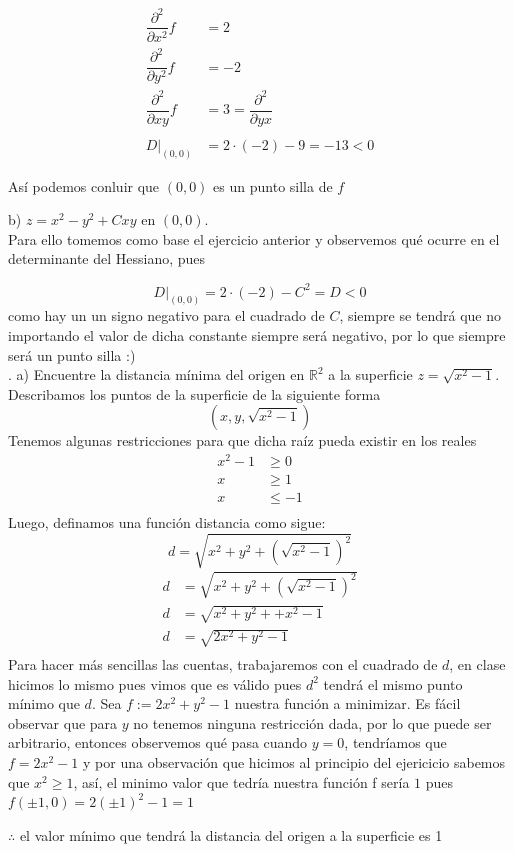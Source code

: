 \documentclass[letterpaper]{article}
\renewcommand{\d}{\partial}
\renewcommand{\*}{\cdot}
\theoremstyle{definition}
\begin{document}
\begin{align*}
	\dfrac{\d^2 }{\d x^2} f &=  2\\ 
	\dfrac{\d^2 }{\d y^2} f &=  -2\\ 
	\dfrac{\d^2 }{\d xy} f &= 3 = \dfrac{\d^2 }{\d yx} \\
	\\
	D\Bigr|_{(0,0)} &= 2 \* (-2) - 9 = -13 < 0
\end{align*}
\begin{center}
	Así podemos conluir que $ (0,0) $ es un punto silla de $ f $\\
\end{center}

b)  $z = x^2 - y^2 + Cxy $ en $(0,0)$.\\
Para ello tomemos como base el ejercicio anterior y observemos qué ocurre en el determinante del Hessiano, pues 

\[ 	D\Bigr|_{(0,0)} = 2 \* (-2) - C^2 = D < 0 \]
como hay un un signo negativo para el cuadrado de $ C $, siempre se tendrá que no importando el valor de dicha constante siempre será negativo, por lo que siempre será un punto silla :)\\

. a) Encuentre la distancia mínima del origen en $\mathbb{R}^2$  a la superficie $z = \sqrt{x^2 - 1}$.\\

Describamos los puntos de la superficie de la siguiente forma 
\[ (x,y, \sqrt{x^2 -1}) \]
Tenemos algunas restricciones para que dicha raíz pueda existir en los reales 
\begin{align*}
	x^2 -1 &\geq 0 \\
	x &\geq 1 \\
	x &\leq -1 \\
\end{align*}
Luego, definamos una función distancia como sigue:
\[  d = \sqrt{x^2 + y^2 + \left(\sqrt{x^2 - 1}\right)^2} \]
\begin{align*}
	d &= \sqrt{x^2 + y^2 + \left(\sqrt{x^2 - 1}\right)^2}\\
	d &= \sqrt{x^2 + y^2 + + x^2 - 1}\\
	d &= \sqrt{2x^2 + y^2 - 1}\\
\end{align*}
Para hacer más sencillas las cuentas, trabajaremos con el cuadrado de $ d $, en clase hicimos lo mismo pues vimos que es válido pues $ d^2 $ tendrá el mismo punto mínimo que $ d $.
Sea $ f := 2x^2 + y^2 -1 $ nuestra función a minimizar. Es fácil observar que para $ y $ no tenemos ninguna restricción dada, por lo que puede ser arbitrario, entonces observemos qué pasa cuando $ y = 0 $, tendríamos que $ f = 2x^2 -1 $ y por una observación que hicimos al principio del ejericicio sabemos que $ x^2 \geq 1 $, así, el minimo valor que tedría nuestra función f sería $ 1 $
pues $ f(\pm1,0) = 2(\pm1)^2-1 = 1 $
\begin{center}
	$ \therefore $ el valor mínimo que tendrá la distancia del origen a la superficie es 1\\
\end{center}
\end{document}

